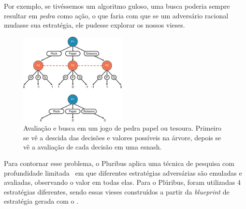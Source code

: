 \documentclass[twocolumn]{article}
\theoremstyle{mytheoremstyle}
\theoremstyle{mytheoremstyle}
\theoremstyle{myproblemstyle}
\begin{document}
        Por exemplo, se tivéssemos um algoritmo guloso, uma busca poderia sempre resultar em \emph{pedra}
        como ação, o que faria com que se um adversário racional mudasse sua estratégia, ele pudesse explorar os nossos vieses.


        \begin{figure}
            \includegraphics[width=0.48\textwidth]{./rps.jpeg}
            \caption{Avaliação e busca em um jogo de pedra papel ou tesoura. Primeiro se vê a descida das decisões e valores possíveis
            na árvore, depois se vê a avaliação de cada decisão em uma \gls{esnash}.}
            \label{fig:rps}
        \end{figure}

        Para contornar esse problema, o Pluribus aplica uma técnica de pesquisa com profundidade limitada~\cite{brown2018depth} em que diferentes estratégias
        adversárias são emuladas e avaliadas, observando o valor em todas elas. Para o Plúribus, foram utilizadas 4 estratégias diferentes, sendo essas
        vieses construídos a partir da \emph{blueprint} de estratégia gerada com o \hyperref[sec:Minização de arrependimento contrafactual de Monte Carlo]{}.





    \clearpage
    \printglossary
    \printglossary[type=\acronymtype]
    \nocite{*}
    
    
\end{document}
